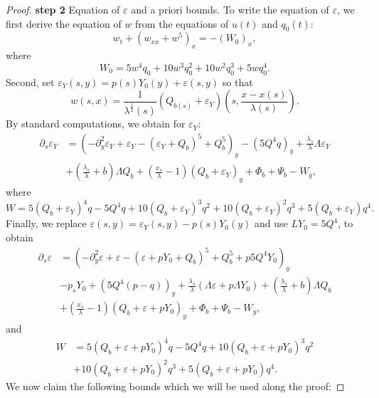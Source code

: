 \documentclass[11pt,a4paper,reqno]{amsart}
\theoremstyle{remark}
\numberwithin{equation}{section}
\newcommand{\be}{\begin{equation}}
\newcommand{\ee}{\end{equation}}
\def\e{\varepsilon}
\def\lsl{\frac{\lambda_s}{\lambda}}
\def\l{\lambda}
\def\lsl{\frac{\lambda_s}{\lambda}}
\def\Yz{Y_0}
\begin{document}
\begin{proof}
{\bf step 2} Equation of $\e$ and a priori bounds. To write the equation of $\e$, we first derive the equation of $w$ from the equations of $u(t)$ and $q_0(t)$:
 \be\label{eqw}
 w_t + (w_{xx} + w^5)_x = - (W_0)_x,
 \ee
 where
 \be\label{Wz}
 W_0 = 5 w^4 q_0 + 10 w^3 q_0^2 + 10w^2 q_0^3 + 5w q_0^4.
  \ee
  Second,   set 
  $ 
 \e_Y(s,y)= p(s) \Yz(y) +\e(s,y)$ so that
 $$
 w(s,x) = \frac{1}{\l^{\frac 12}(s)} \left( Q_{b(s)} +
 \e_Y \right)\left(s,\frac {x-x(s)}{\l(s)}\right).
  $$
By standard computations, we obtain for $\e_Y$:
  \begin{align}  \nonumber  
  \partial_s \e_Y & = (-\partial_{y}^2 \e_Y + \e_Y - (\e_Y+Q_b)^5 +Q_b^5)_y
- (5 Q^4 q)_y +\lsl \Lambda \e_Y
\\
& + \left(\frac {{\lambda}_{s}}{{\lambda}}+{b}\right) {\Lambda} Q_b 
+ \left(\frac { x_{s}}{\lambda} -1\right) (Q_b + \e_Y)_y   
+ \Phi_{b}  
 + \Psi_{{b}}   -W_y,
\label{eqofepsY}\end{align}
where  $$
W=5(Q_b+ \e_Y)^4 q- 5 Q^4 q + 10(Q_b+\e_Y)^3 q^2 + 10(Q_b+\e_Y)^2 q^3 + 5(Q_b+\e_Y) q^4.
$$
Finally, we replace   $ 
 \e(s,y) = \e_Y(s,y)- p(s) \Yz(y) $ and use $L \Yz = 5 Q^4  $, to obtain
   \begin{align}  \nonumber  
  \partial_s \varepsilon  &  = \left(-\partial_{y}^2 \e  + \e  - (\e +p \Yz +Q_b)^5 +Q_b^5 + p5Q^4 \Yz\right)_y
\\ & -p_s \Yz +(  5 Q^4 (p-q) )_y +\lsl (\Lambda \e+p\Lambda \Yz)
 + \left(\frac {{\lambda}_{s}}{{\lambda}}+{b}\right) {\Lambda} Q_b 
\nonumber \\
&+ \left(\frac { x_{s}}{\lambda} -1\right) (Q_b + \varepsilon+p  \Yz)_y   
+ \Phi_{b}  
 + \Psi_{{b}}   -W_y,
\label{eqofeps}\end{align}
and
\begin{align*}
W&=5(Q_b+ \e+p  \Yz)^4 q- 5 Q^4 q + 10(Q_b+\e+p  \Yz)^3 q^2 \\
&+ 10(Q_b+\e+p  \Yz)^2 q^3 + 5(Q_b+\e+p  \Yz) q^4.
\end{align*}
We now claim the following bounds which we will be used along the proof:


\end{proof}
\end{document}

